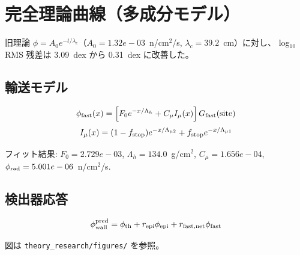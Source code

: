 \section{完全理論曲線（多成分モデル）}

旧理論 $\phi = A_0 e^{-t/\lambda_c}$（$A_0=1.32e-03$~n/cm$^2$/s, $\lambda_c=39.2$~cm）に対し、
log$_{10}$ RMS 残差は 3.09~dex から 0.31~dex に改善した。

\subsection{輸送モデル}
\begin{equation}
\phi_{\rm fast}(x) = \left[ F_0 e^{-x/\Lambda_h} + C_\mu I_\mu(x) \right] G_{\rm fast}({\rm site})
\end{equation}
\begin{equation}
I_\mu(x) = (1-f_{\rm stop})e^{-x/\Lambda_{\mu 2}} + f_{\rm stop} e^{-x/\Lambda_{\mu 1}}
\end{equation}

フィット結果: $F_0=2.729e-03$, $\Lambda_h=134.0$~g/cm$^2$,
$C_\mu=1.656e-04$, $\phi_{\rm rad}=5.001e-06$~n/cm$^2$/s.

\subsection{検出器応答}
\begin{equation}
\phi_{\rm wall}^{\rm pred} = \phi_{\rm th} + r_{\rm epi}\phi_{\rm epi} + r_{\rm fast,net}\phi_{\rm fast}
\end{equation}

図は \texttt{theory\_research/figures/} を参照。
